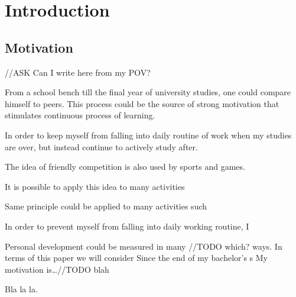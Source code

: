 
\chapter{Introduction}\label{ch:introduction}

\section{Motivation}\label{sec:motivation}

{\color{gray}//ASK Can I write here from my POV?}

From a school bench till the final year of university studies, one could compare himself to peers.
This process could be the source of strong motivation that stimulates continuous process of learning.

In order to keep myself from falling into daily routine of work when my studies are over,
but instead continue to actively study after.

The idea of friendly competition is also used by sports and games.


It is possible to apply this idea to many activities

Same principle could be applied to many activities such

In order to prevent myself from falling into daily working routine, I



Personal development could be measured in many {\color{blue}//TODO which?} ways.
In terms of this paper we will consider
Since the end of my bachelor's s
My motivation is\ldots {\color{blue}//TODO blah}\par
Bla la la.
